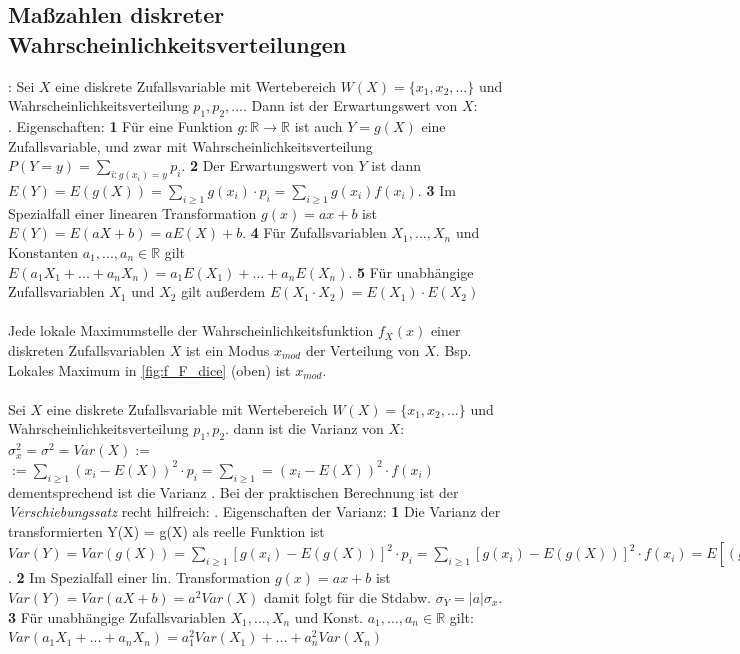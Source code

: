 \subsection{Maßzahlen diskreter Wahrscheinlichkeitsverteilungen}
: Sei $X$ eine diskrete Zufallsvariable mit Wertebereich $W(X) = \{x_1, x_2, ...\}$ und Wahrscheinlichkeitsverteilung $p_1, p_2, ...$. Dann ist der Erwartungswert von $X$:\\ . Eigenschaften: \textbf{1} Für eine Funktion $g: \mathds{R} \rightarrow \mathds{R}$ ist auch $Y = g(X)$ eine Zufallsvariable, und zwar mit Wahrscheinlichkeitsverteilung $P(Y = y) = \sum_{i: g(x_i) = y} p_i$. \textbf{2} Der Erwartungswert von $Y$ ist dann $E(Y) = E(g(X)) = \sum_{i\ge1} g(x_i) \cdot p_i = \sum_{i\ge1} g(x_i) f(x_i)$. \textbf{3} Im Spezialfall einer linearen Transformation $g(x) = ax + b$ ist $E(Y) = E(aX+b) = aE(X) + b$. \textbf{4} Für Zufallsvariablen $X_1, ..., X_n$ und Konstanten $a_1, ..., a_n \in \mathds{R}$ gilt $E(a_1X_1 + ... + a_nX_n) = a_1E(X_1) + ... + a_nE(X_n)$. \textbf{5} Für unabhängige Zufallsvariablen $X_1$ und $X_2$ gilt außerdem $E(X_1 \cdot X_2) = E(X_1) \cdot E(X_2)$\\\\
 Jede lokale Maximumstelle der Wahrscheinlichkeitsfunktion $f_X(x)$ einer diskreten Zufallsvariablen $X$ ist ein Modus $x_{mod}$ der Verteilung von $X$. Bsp. Lokales Maximum in \cref{fig:f_F_dice} (oben) ist $x_{mod}$.\\\\
 Sei $X$ eine diskrete Zufallsvariable mit Wertebereich $W(X) = \{x_1, x_2, ...\}$ und Wahrscheinlichkeitsverteilung $p_1, p_2$. dann ist die Varianz von $X$: $\sigma_x^2 = \sigma^2 = Var(X):= $ $ :=\sum_{i\ge1} (x_i - E(X))^2 \cdot p_i = \sum_{i\ge1} = (x_i - E(X))^2 \cdot f(x_i)$ dementsprechend ist die Varianz . Bei der praktischen Berechnung ist der \emph{Verschiebungssatz} recht hilfreich: . Eigenschaften der Varianz: \textbf{1} Die Varianz der transformierten Y(X) = g(X) als reelle Funktion ist $Var(Y) = Var(g(X)) = \sum_{i\ge1} [g(x_i) - E(g(X))]^2 \cdot p_i = \sum_{i\ge1} [g(x_i) - E(g(X))]^2 \cdot f(x_i) = E[(g(X) - E(g(X)))^2] = E(g(X)^2) - E^2(g(X))$. \textbf{2} Im Spezialfall einer lin. Transformation $g(x) = ax + b$  ist $Var(Y) = Var(aX + b) = a^2Var(X)$ damit folgt für die Stdabw. $\sigma_Y = |a|\sigma_x$. \textbf{3} Für unabhängige Zufallsvariablen $X_1, ..., X_n$ und Konst. $a_1, ..., a_n \in \mathds{R}$ gilt: $Var(a_1X_1 + ... + a_nX_n) = a_1^2Var(X_1) + ... + a_n^2Var(X_n)$ 
\newpage
